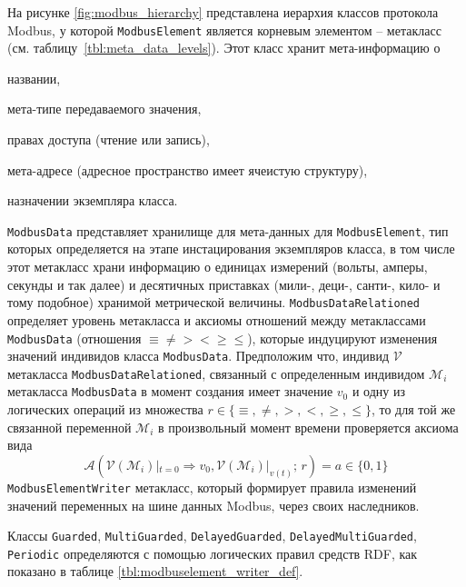На рисунке \ref{fig:modbus_hierarchy} представлена иерархия классов протокола Modbus,
у которой \texttt{ModbusElement} является корневым элементом -- метакласс (см. таблицу~\ref{tbl:meta_data_levels}).
Этот класс хранит мета-информацию о
\begin{enumerate*}[label=\arabic*\upshape)]
    \item названии, 
    \item мета-типе передаваемого значения,
    \item правах доступа (чтение или запись),
    \item мета-адресе (адресное пространство имеет ячеистую структуру),
    \item назначении экземпляра класса.
\end{enumerate*}
%
\texttt{ModbusData} представляет хранилище для мета-данных для \texttt{ModbusElement}, тип которых определяется на этапе инстацирования экземпляров класса,
    в том числе этот метакласс храни информацию о единицах измерений (вольты, амперы, секунды и так далее) и десятичных приставках (мили-, деци-, санти-, кило- и тому подобное)
    хранимой метрической величины.
%
\texttt{ModbusDataRelationed} определяет уровень метакласса и аксиомы отношений между метаклассами \texttt{ModbusData}
    (отношения $\equiv \ne > < \ge \le$), которые индуцируют изменения значений индивидов класса \texttt{ModbusData}.
    Предположим что, индивид $\mathcal{V}$ метакласса \texttt{ModbusDataRelationed}, связанный с определенным
    индивидом $\mathcal{M}_i$ метакласса \texttt{ModbusData} в момент создания имеет значение $v_0$ и одну из логических операций из множества $r \in \{\equiv,\ne,>,<,\ge,\le\}$,
    то для той же связанной переменной $\mathcal{M}_i$ в произвольный момент времени проверяется аксиома вида 
    \begin{equation}\label{eq:axiom_modbusdatarelationed}
        \mathcal{A}\left(\mathcal{V}(\mathcal{M}_i)|_{t=0}\Rightarrow v_0, \mathcal{V}(\mathcal{M}_i)|_{v(t)};\, r\right) = a \in \{0, 1\}
    \end{equation}
%
\texttt{ModbusElementWriter} метакласс, который формирует правила изменений значений переменных на шине данных Modbus,
    через своих наследников.



Классы \texttt{Guarded}, \texttt{MultiGuarded}, \texttt{DelayedGuarded}, \texttt{DelayedMultiGuarded}, \texttt{Periodic}
определяются с помощью логических правил средств RDF, как показано в таблице \ref{tbl:modbuselement_writer_def}.

